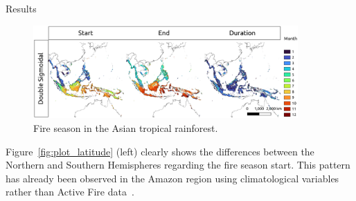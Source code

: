 \documentclass[20pt]{beamer}
\begin{document}
\begin{frame}[fragile,t]
\begin{columns}[t]
\begin{column}{0.33\linewidth}
\begin{block}{Results\vphantom{g}}
\begin{figure}[ht]
\centering
\includegraphics[width=0.9\textwidth]{figures/dsig_tropical_asia.png}
\caption{Fire season in the Asian tropical rainforest.}
\label{fig:dsig_tropical_asia}
\end{figure}

    \vspace{0.5cm}

Figure~\ref{fig:plot_latitude} (left) clearly shows the differences between the Northern and Southern Hemispheres regarding the fire season start.
This pattern has already been observed in the Amazon region using climatological variables rather than Active Fire data~\cite{carvalho2021a}.

    \vspace{0.5cm}


\end{block}
\end{column}
\end{columns}
\end{frame}
\end{document}
